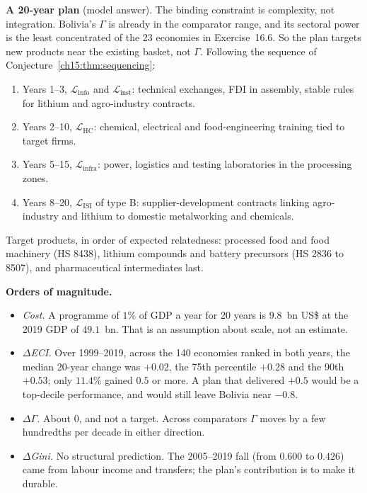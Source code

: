 \documentclass[../solutions_manual.tex]{subfiles}
\begin{document}
 \textbf{A 20-year plan} (model answer). The binding constraint is complexity, not integration. Bolivia's $\Gamma$ is already in the comparator range, and its sectoral power is the least concentrated of the 23 economies in Exercise~16.6. So the plan targets new products near the existing basket, not $\Gamma$. Following the sequence of Conjecture~\ref{ch15:thm:sequencing}:
\begin{enumerate}
\item Years 1--3, $\mathcal{L}_{\text{info}}$ and $\mathcal{L}_{\text{inst}}$: technical exchanges, FDI in assembly, stable rules for lithium and agro-industry contracts.
\item Years 2--10, $\mathcal{L}_{\text{HC}}$: chemical, electrical and food-engineering training tied to target firms.
\item Years 5--15, $\mathcal{L}_{\text{infra}}$: power, logistics and testing laboratories in the processing zones.
\item Years 8--20, $\mathcal{L}_{\text{ISI}}$ of type B: supplier-development contracts linking agro-industry and lithium to domestic metalworking and chemicals.
\end{enumerate}
Target products, in order of expected relatedness: processed food and food machinery (HS 8438), lithium compounds and battery precursors (HS 2836 to 8507), and pharmaceutical intermediates last.

 \textbf{Orders of magnitude.}
\begin{itemize}
\item \emph{Cost.} A programme of $1\%$ of GDP a year for 20 years is $9.8$~bn US\$ at the 2019 GDP of $49.1$~bn. That is an assumption about scale, not an estimate.
\item \emph{$\Delta$ECI.} Over 1999--2019, across the 140 economies ranked in both years, the median 20-year change was $+0.02$, the 75th percentile $+0.28$ and the 90th $+0.53$; only $11.4\%$ gained $0.5$ or more. A plan that delivered $+0.5$ would be a top-decile performance, and would still leave Bolivia near $-0.8$.
\item \emph{$\Delta\Gamma$.} About $0$, and not a target. Across comparators $\Gamma$ moves by a few hundredths per decade in either direction.
\item \emph{$\Delta$Gini.} No structural prediction. The 2005--2019 fall (from $0.600$ to $0.426$) came from labour income and transfers; the plan's contribution is to make it durable.
\end{itemize}
\end{document}
